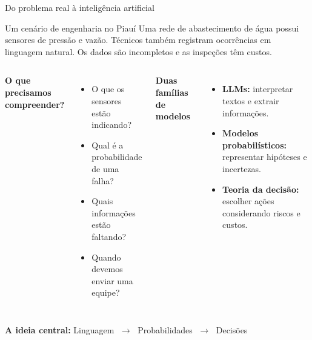 \documentclass[aspectratio=169,11pt]{beamer}
\begin{document}

\begin{frame}{Do problema real à inteligência artificial}

\begin{block}{Um cenário de engenharia no Piauí}
Uma rede de abastecimento de água possui sensores de pressão
e vazão. Técnicos também registram ocorrências em linguagem
natural. Os dados são incompletos e as inspeções têm custos.
\end{block}

\vspace{0.25cm}

\begin{columns}[T]

\textbf{O que precisamos compreender?}

\begin{itemize}
    \item O que os sensores estão indicando?
    \item Qual é a probabilidade de uma falha?
    \item Quais informações estão faltando?
    \item Quando devemos enviar uma equipe?
\end{itemize}

\textbf{Duas famílias de modelos}

\begin{itemize}
    \item \textbf{LLMs:} interpretar textos e extrair informações.
    \item \textbf{Modelos probabilísticos:} representar
    hipóteses e incertezas.
    \item \textbf{Teoria da decisão:} escolher ações considerando
    riscos e custos.
\end{itemize}

\end{columns}

\vspace{0.35cm}

\begin{center}
\large
\textbf{A ideia central:}
\quad
\textcolor{petrol}{Linguagem}
$\;\longrightarrow\;$
\textcolor{petrol}{Probabilidades}
$\;\longrightarrow\;$
\textcolor{petrol}{Decisões}
\end{center}

\end{frame}
\end{document}
